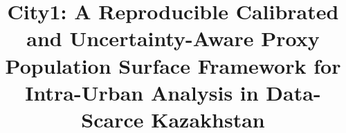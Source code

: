 \documentclass[11pt]{article}
\title{City1: A Reproducible Calibrated and Uncertainty-Aware Proxy Population Surface Framework for Intra-Urban Analysis in Data-Scarce Kazakhstan}
\author{}
\date{}
\begin{document}
\maketitle

\begin{abstract}

\end{abstract}
















\end{document}
